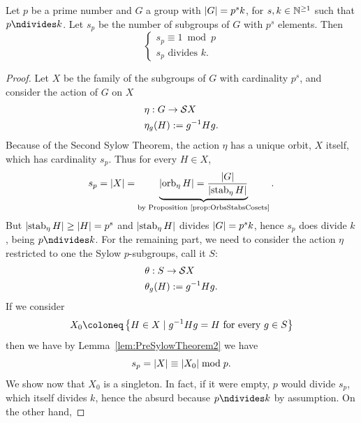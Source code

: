\begin{proposition}\label{prop:SylowTheorem}
Let \(p\) be a prime number and  \(G\) a group with \(\left\lvert G\right\rvert = p^s k\), for \(s, k \in \mathbb N^{\ge 1}\) such that \(p \ndivides k\). Let \(s_p\) be the number of subgroups of \(G\) with \(p^s\) elements. Then
\[\begin{cases}
s_p \equiv 1 \bmod p \\
s_p \text{ divides } k .
\end{cases}\]
\end{proposition}

\begin{proof}
Let \(X\) be the family of the subgroups of \(G\) with cardinality \(p^s\), and consider the action of \(G\) on \(X\)
\begin{align*}
& \eta : G \to \mathcal S X\\
& \eta_g (H) := g^{-1} H g .
\end{align*}
Because of the Second Sylow Theorem, the action \(\eta\) has a unique orbit, \(X\) itself, which has cardinality \(s_p\). Thus for every \(H \in X\),
\[s_p = \left\lvert X\right\rvert = \underbrace{\left\lvert\operatorname{orb}_\eta H\right\rvert = \frac{\left\lvert G\right\rvert}{\left\lvert\operatorname{stab}_\eta H\right\rvert}}_{\text{by Proposition~\ref{prop:OrbsStabsCosets}}}.\]
But \(\left\lvert\operatorname{stab}_\eta H\right\rvert \ge \left\lvert H\right\rvert = p^s\) and \(\left\lvert\operatorname{stab}_\eta H\right\rvert\) divides \(\left\lvert G\right\rvert = p^s k\), hence \(s_p\) does divide \(k\), being \(p \ndivides k\). For the remaining part, we need to consider the action \(\eta\) restricted to one the Sylow \(p\)-subgroups, call it \(S\):
\begin{align*}
& \theta : S \to \mathcal S X\\
& \theta_g (H) := g^{-1} H g .
\end{align*}
If we consider
\[X_0 \coloneq \set{H \in X \mid \inv g H g = H \text{ for every } g \in S}\]
then we have by Lemma~\ref{lem:PreSylowTheorem2} we have
\[s_p = \left\lvert X\right\rvert \equiv \left\lvert X_0\right\rvert \bmod p .\]
We show now that \(X_0\) is a singleton. In fact, if it were empty, \(p\) would divide \(s_p\), which itself divides \(k\), hence the absurd because \(p \ndivides k\) by assumption. On the other hand, 
\end{proof}
